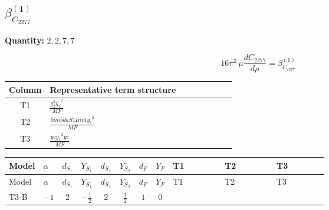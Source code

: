 \documentclass[8pt]{article}
\begin{document}
\begin{landscape}
\section*{$\beta_{C_{2277}}^{(1)}$}
\noindent\textbf{Quantity: }$\mathrm{2,2,7,7}$\par\smallskip
\[16\pi^2\,\mu\frac{d C_{2277}}{d\mu}=\beta_{C_{2277}}^{(1)}\]
\begin{center}
\begin{tabular}{@{}c >{\raggedright\arraybackslash}p{0.82\linewidth}@{}}
\toprule
Column & Representative term structure \\
\midrule
T1 & \(\displaystyle \frac{g_{2}^{2} \overline{y_{1}}^{2}}{MF}\) \\
\midrule
T2 & \(\displaystyle \frac{lambdaS1Inv1 \overline{y_{1}}^{2}}{MF}\) \\
\midrule
T3 & \(\displaystyle \frac{ye \overline{y_{1}}^{2} \overline{ye}}{MF}\) \\
\midrule
\bottomrule
\end{tabular}
\end{center}
\smallskip
\tiny
\begin{longtable}{@{}llcccccc >{\raggedright\arraybackslash}p{0.21\linewidth} >{\raggedright\arraybackslash}p{0.21\linewidth} >{\raggedright\arraybackslash}p{0.21\linewidth}@{}}
\toprule
Model & $\alpha$ & $d_{S_1}$ & $Y_{S_1}$ & $d_{S_2}$ & $Y_{S_2}$ & $d_F$ & $Y_F$ & T1 & T2 & T3 \\
\midrule
\endfirsthead
\toprule
Model & $\alpha$ & $d_{S_1}$ & $Y_{S_1}$ & $d_{S_2}$ & $Y_{S_2}$ & $d_F$ & $Y_F$ & T1 & T2 & T3 \\
\midrule
\endhead
T3-B & $-1$ & $2$ & $-\frac{1}{2}$ & $2$ & $\frac{1}{2}$ & $1$ & $0$ & \scriptsize\adjustbox{max width=\linewidth}{$\begin{gathered} - \frac{3 g_{2}^{2} \overline{y_{1}}^{2}}{4 MF}\end{gathered}$} & \scriptsize\adjustbox{max width=\linewidth}{$\begin{gathered} - \frac{lambdaS1Inv1 \overline{y_{1}}^{2}}{2 MF}\end{gathered}$} & \scriptsize\adjustbox{max width=\linewidth}{$\begin{gathered} \frac{ye \overline{y_{1}}^{2} \overline{ye}}{4 MF}\end{gathered}$} \\
\midrule
\bottomrule
\end{longtable}
\clearpage

\end{landscape}
\end{document}
